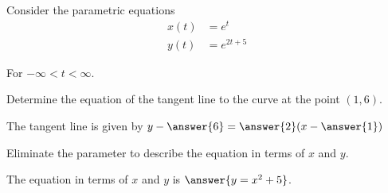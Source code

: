 \documentclass{ximera}
\author{Jim Talamo}
\begin{document}
\begin{exercise}
Consider the parametric equations 
\begin{align*}
x(t) &= e^t\\
y(t) &= e^{2t+5}
\end{align*}

For $-\infty < t < \infty$.

Determine the equation of the tangent line to the curve at the point $(1,6)$. 

The tangent line is given by $y-\answer{6}=\answer{ 2 }(x-\answer{1})$

\begin{exercise}

Eliminate the parameter to describe the equation in terms of $x$ and $y$. 

The equation in terms of $x$ and $y$ is $\answer{  y=x^2+5}$.


\end{exercise}
\end{exercise}
\end{document}
